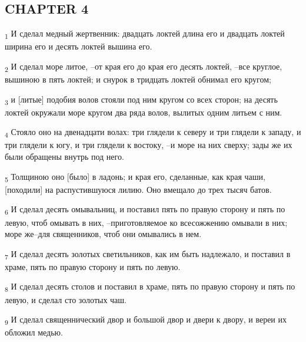\subsection{CHAPTER 4}
\begin{tcolorbox}
\textsubscript{1} И сделал медный жертвенник: двадцать локтей длина его и двадцать локтей ширина его и десять локтей вышина его.
\end{tcolorbox}
\begin{tcolorbox}
\textsubscript{2} И сделал море литое, --от края его до края его десять локтей, --все круглое, вышиною в пять локтей; и снурок в тридцать локтей обнимал его кругом;
\end{tcolorbox}
\begin{tcolorbox}
\textsubscript{3} и [литые] подобия волов стояли под ним кругом со всех сторон; на десять локтей окружали море кругом два ряда волов, вылитых одним литьем с ним.
\end{tcolorbox}
\begin{tcolorbox}
\textsubscript{4} Стояло оно на двенадцати волах: три глядели к северу и три глядели к западу, и три глядели к югу, и три глядели к востоку, --и море на них сверху; зады же их были обращены внутрь под него.
\end{tcolorbox}
\begin{tcolorbox}
\textsubscript{5} Толщиною оно [было] в ладонь; и края его, сделанные, как края чаши, [походили] на распустившуюся лилию. Оно вмещало до трех тысяч батов.
\end{tcolorbox}
\begin{tcolorbox}
\textsubscript{6} И сделал десять омывальниц, и поставил пять по правую сторону и пять по левую, чтоб омывать в них, --приготовляемое ко всесожжению омывали в них; море же--для священников, чтоб они омывались в нем.
\end{tcolorbox}
\begin{tcolorbox}
\textsubscript{7} И сделал десять золотых светильников, как им быть надлежало, и поставил в храме, пять по правую сторону и пять по левую.
\end{tcolorbox}
\begin{tcolorbox}
\textsubscript{8} И сделал десять столов и поставил в храме, пять по правую сторону и пять по левую, и сделал сто золотых чаш.
\end{tcolorbox}
\begin{tcolorbox}
\textsubscript{9} И сделал священнический двор и большой двор и двери к двору, и вереи их обложил медью.
\end{tcolorbox}
